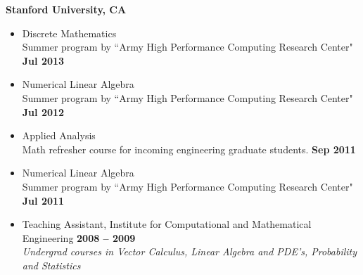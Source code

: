 \documentclass[margin,line]{resume}
\begin{document}
\begin{resume}
	\textbf{Stanford University, CA}
	\begin{itemize}
	\item Discrete Mathematics\\
	Summer program by ``Army High Performance Computing Research Center" \hfill \textbf{Jul 2013}
	\item Numerical Linear Algebra\\
	Summer program by ``Army High Performance Computing Research Center" \hfill \textbf{Jul 2012}
	\item Applied Analysis\\
	Math refresher course for incoming engineering graduate students. \hfill \textbf{Sep 2011}
	\item Numerical Linear Algebra\\
	Summer program by ``Army High Performance Computing Research Center" \hfill \textbf{Jul 2011}
	\item Teaching Assistant, Institute for Computational and Mathematical Engineering \hfill \textbf{2008 -- 2009}\\
	\textsl{Undergrad courses in Vector Calculus, Linear Algebra and PDE's, Probability and Statistics}
	\end{itemize}



\end{resume}
\end{document}
